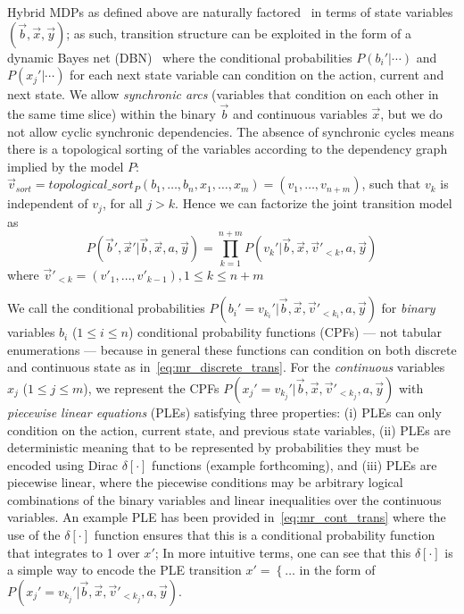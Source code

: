 Hybrid MDPs as defined above are naturally factored~\cite{boutilier99dt}
in terms of state variables $(\vec{b},\vec{x},\vec{y})$; as such,
transition structure can be exploited in the form of a dynamic Bayes
net (DBN)~\cite{dbn} where the conditional probabilities
$P(b_i'|\cdots)$ and $P(x_j'|\cdots)$ for each next state variable can
condition on the action, current and next state.  We allow  
\emph{synchronic arcs} (variables that condition on each
other in the same time slice) within the binary $\vec{b}$ and
continuous variables $\vec{x}$, but we do not allow cyclic synchronic dependencies. 
The absence of synchronic cycles means there is a topological sorting of the variables according to the dependency graph implied by the model $P$: $\vec{v}_{sort}=topological\_sort_{P}( b_1,\ldots,b_n,x_{1},\ldots,x_m ) =  ( v_1,\ldots, v_{n+m})$, such that $v_k$ is independent of $v_j$, for all $j >k$. Hence we can factorize the joint transition model as
{\footnotesize
\begin{equation}
P(\vec{b}',\vec{x}'|\vec{b},\vec{x},a,\vec{y}) = 
\prod_{k=1}^{n+m} P(v_k'| \vec{b},\vec{x}, \vec{v}'_{<k}, a,\vec{y}) \nonumber %
\end{equation}}
where $\vec{v}'_{<k} = ( v'_1,\ldots, v'_{k-1}), 1\leq k \leq n+m$

We call the conditional probabilities
$P(b_i'=v_{k_i}'|\vec{b},\vec{x},\vec{v}'_{<{k_i}},a,\vec{y})$ for \emph{binary} variables $b_i$
($1 \leq i \leq n$) conditional probability functions (CPFs) --- not
tabular enumerations --- because in general these functions can
condition on both discrete and continuous state as
in~\eqref{eq:mr_discrete_trans}.  For the \emph{continuous} variables
$x_j$ ($1 \leq j \leq m$), we represent the CPFs
$P(x_j'=v_{k_j}'|\vec{b},\vec{x},\vec{v}'_{<{k_j}},a,\vec{y})$ with \emph{piecewise
linear equations} (PLEs) satisfying three properties: (i) PLEs 
can only condition on the
action, current state, and previous state variables, (ii) PLEs are
deterministic meaning that to be represented by probabilities they
must be encoded using Dirac $\delta[\cdot]$ functions (example
forthcoming), and (iii) PLEs are piecewise linear, where the piecewise
conditions may be arbitrary logical combinations of the binary variables
and linear inequalities over the continuous variables.  An example PLE has been
provided in~\eqref{eq:mr_cont_trans} where the use of the 
$\delta[\cdot]$ function ensures that this is a conditional
probability function that integrates to 1 over $x'$; In more intuitive
terms, one can see that this $\delta[\cdot]$ is a simple way to encode
the PLE transition $x' = \left\{ \ldots \right.$ in the form of 
$P(x_j'=v_{k_j}'|\vec{b},\vec{x},\vec{v}'_{<{k_j}},a,\vec{y})$.

